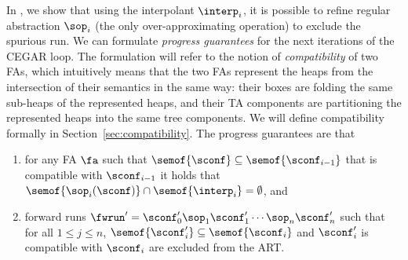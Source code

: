 In , we show that
using the interpolant $\interp_{i}$, 
it is possible to refine regular abstraction $\sop_i$ (the only over-approximating operation)
to exclude the spurious run.
We can formulate \emph{progress guarantees} for the next iterations of the CEGAR loop. 
%
The formulation will refer to the notion of \emph{compatibility} of two FAs,
which intuitively means that the two FAs represent the heaps from the
intersection of their semantics in the same way: their boxes are folding the
same sub-heaps of the represented heaps, and their TA components are
partitioning the represented heaps into the same tree components. 
We will define compatibility formally in Section~\ref{sec:compatibility}.
%
The progress guarantees are that  
\begin{enumerate}
\item
for any FA $\fa$ such that  
$\semof{\sconf}\subseteq\semof{\sconf_{i-1}}$ 
that is compatible with $\sconf_{i-1}$ %
it holds that
$\semof{\sop_i(\sconf)} \cap \semof{\interp_i} = \emptyset$, and
%
\item
forward runs $\fwrun' = \sconf_0'\sop_1\sconf_1'\cdots\sop_n\sconf_n'$ such
that for all $1\leq j \leq n$, $\semof{\sconf_i'}\subseteq\semof{\sconf_i}$
and $\sconf_i'$ is compatible with $\sconf_i$ are excluded from the
ART.
\end{enumerate}
%
%
%
%
%
%
%


